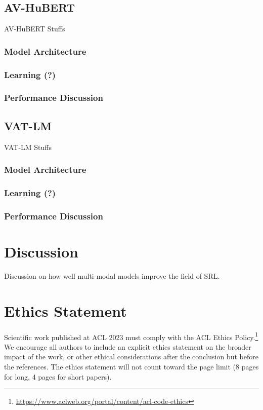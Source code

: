 \documentclass[11pt]{article}
\begin{document}
\subsection{AV-HuBERT}

AV-HuBERT Stuffs

\subsubsection{Model Architecture}
\subsubsection{Learning (?)}
\subsubsection{Performance Discussion}

\subsection{VAT-LM}

VAT-LM Stuffs

\subsubsection{Model Architecture}
\subsubsection{Learning (?)}
\subsubsection{Performance Discussion}


\section{Discussion}
Discussion on how well multi-modal models improve the field of SRL.\@

\section*{Ethics Statement}
Scientific work published at ACL 2023 must comply with the ACL Ethics Policy.\footnote{\url{https://www.aclweb.org/portal/content/acl-code-ethics}} We encourage all authors to include an explicit ethics statement on the broader impact of the work, or other ethical considerations after the conclusion but before the references. The ethics statement will not count toward the page limit (8 pages for long, 4 pages for short papers).
\end{document}

